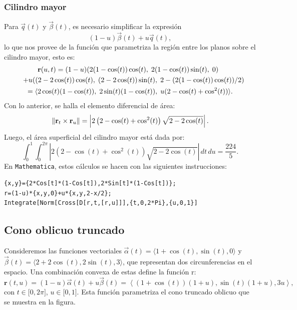 \subsubsection{Cilindro mayor}
Para $\overrightarrow{q}(t)$ y $\overrightarrow{\beta}(t)$, es necesario simplificar la expresión
\[
(1 - u)\overrightarrow{\beta}(t) + u\overrightarrow{q}(t),
\]
lo que nos provee de la función que parametriza la región entre los planos sobre el cilindro mayor, esto es:
\begin{gather*}
\hspace{-0.6em}\mathbf{r}(u,t) = (1 - u)(2(1 - \cos(t))\cos(t),\; 2(1 - \cos(t))\sin(t),\; 0) \\
\quad + u((2 - 2\cos(t))\cos(t),\; (2 - 2\cos(t))\sin(t),\; 2 - (2(1 - \cos(t))\cos(t))/2) \\
= \langle 2\cos(t)(1 - \cos(t)),\; 2\sin(t)(1 - \cos(t)),\; u(2 - \cos(t) + \cos^2(t)) \rangle.
\end{gather*}
Con lo anterior, se halla el elemento diferencial de área:
\[
\left\| {\bf r}_{t} \times {\bf r}_{u} \right\| = \left| 2\left(2 - \cos(t) + \cos^2(t)\right) \sqrt{2 - 2\cos(t)} \right|.
\]
Luego, el área superficial del cilindro mayor está dada por:
\[
\int_{0}^{1} \int_{0}^{2\pi} \left| 2\left(2 - \cos(t) + \cos^2(t)\right) \sqrt{2 - 2\cos(t)} \right| \, dt \, du = \frac{224}{5}.
\]
En \verb"Mathematica", estos cálculos se hacen con las siguientes instrucciones:

\begin{tcolorbox}[title=\bf Instrucción en \verb"Mathematica"]\begin{Verbatim}[formatcom=\letraverbatim]
{x,y}={2*Cos[t]*(1-Cos[t]),2*Sin[t]*(1-Cos[t])};
r=(1-u)*{x,y,0}+u*{x,y,2-x/2};
Integrate[Norm[Cross[D[r,t,[r,u]]],{t,0,2*Pi},{u,0,1}]
\end{Verbatim}
\end{tcolorbox}

\subsection{Cono oblicuo truncado}
Consideremos las funciones vectoriales $\overrightarrow{\alpha }(t) =\langle 1+\cos \left(
t\right) ,\sin (t) ,0\rangle$ y $\overrightarrow{\beta }(t) =\langle 2+2\cos \left(
t\right) ,2\sin (t) ,3 \rangle$,
que representan dos circunferencias en el espacio. Una combinación convexa de estas define la función r:
\begin{equation*}
\mathbf{r}(t, u) = (1-u)\overrightarrow{\alpha}(t) + u\overrightarrow{\beta}(t) = \left\langle (1+\cos(t))(1+u), \sin(t)(1+u), 3u\right\rangle,
\end{equation*}
con $t\in \lbrack 0,2\pi ]$, $u\in \lbrack 0,1]$. Esta función parametriza el cono truncado oblicuo que se muestra en la figura.

